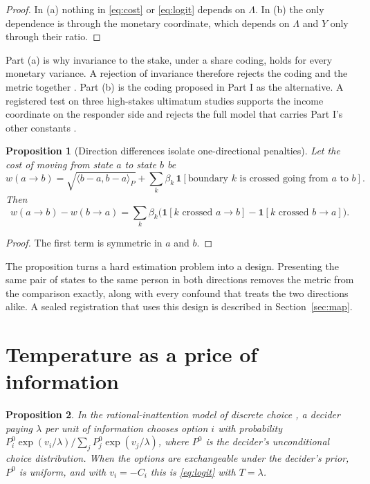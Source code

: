 \documentclass[11pt]{article}
\newtheorem{proposition}{Proposition}
\theoremstyle{definition}
\newcommand{\ip}[2]{\langle #1, #2\rangle_P}
\begin{document}
\begin{proof}
In (a) nothing in \eqref{eq:cost} or \eqref{eq:logit} depends on $\Lambda$.
In (b) the only dependence is through the monetary coordinate, which depends on $\Lambda$ and $Y$ only through their ratio.
\end{proof}

Part (a) is why invariance to the stake, under a share coding, holds for every monetary variance.
A rejection of invariance therefore rejects the coding and the metric together \citep{BondPartI}.
Part (b) is the coding proposed in Part I as the alternative.
A registered test on three high-stakes ultimatum studies supports the income coordinate on the responder side and rejects the full model that carries Part I's other constants \citep{BondPartII}.

\begin{proposition}[Direction differences isolate one-directional penalties]\label{prop:edge}
Let the cost of moving from state $a$ to state $b$ be
\[
w(a \to b) = \sqrt{\ip{b-a}{b-a}} + \sum_k \beta_k\, \mathbf{1}[\text{boundary } k \text{ is crossed going from } a \text{ to } b].
\]
Then
\[
w(a \to b) - w(b \to a) = \sum_k \beta_k \bigl(\mathbf{1}[k \text{ crossed } a \to b] - \mathbf{1}[k \text{ crossed } b \to a]\bigr).
\]
\end{proposition}

\begin{proof}
The first term is symmetric in $a$ and $b$.
\end{proof}

The proposition turns a hard estimation problem into a design.
Presenting the same pair of states to the same person in both directions removes the metric from the comparison exactly, along with every confound that treats the two directions alike.
A sealed registration that uses this design is described in Section~\ref{sec:map}.

\section{Temperature as a price of information}\label{sec:temperature}

\begin{proposition}\label{prop:ri}
In the rational-inattention model of discrete choice \citep{MatejkaMcKay2015}, a decider paying $\lambda$ per unit of information chooses option $i$ with probability $P^0_i \exp(v_i/\lambda) / \sum_j P^0_j \exp(v_j/\lambda)$, where $P^0$ is the decider's unconditional choice distribution.
When the options are exchangeable under the decider's prior, $P^0$ is uniform, and with $v_i = -C_i$ this is \eqref{eq:logit} with $T = \lambda$.
\end{proposition}
\end{document}
